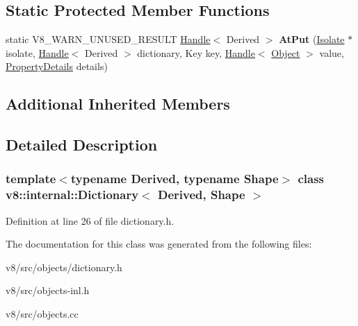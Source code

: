 \subsection*{Static Protected Member Functions}
\begin{DoxyCompactItemize}
\item 
\mbox{\label{classv8_1_1internal_1_1Dictionary_a0a9f58bba6ebd7969d6ca0740bbe90fe}} 
static V8\+\_\+\+W\+A\+R\+N\+\_\+\+U\+N\+U\+S\+E\+D\+\_\+\+R\+E\+S\+U\+LT \mbox{\hyperlink{classv8_1_1internal_1_1Handle}{Handle}}$<$ Derived $>$ {\bfseries At\+Put} (\mbox{\hyperlink{classv8_1_1internal_1_1Isolate}{Isolate}} $\ast$isolate, \mbox{\hyperlink{classv8_1_1internal_1_1Handle}{Handle}}$<$ Derived $>$ dictionary, Key key, \mbox{\hyperlink{classv8_1_1internal_1_1Handle}{Handle}}$<$ \mbox{\hyperlink{classv8_1_1internal_1_1Object}{Object}} $>$ value, \mbox{\hyperlink{classv8_1_1internal_1_1PropertyDetails}{Property\+Details}} details)
\end{DoxyCompactItemize}
\subsection*{Additional Inherited Members}


\subsection{Detailed Description}
\subsubsection*{template$<$typename Derived, typename Shape$>$\newline
class v8\+::internal\+::\+Dictionary$<$ Derived, Shape $>$}



Definition at line 26 of file dictionary.\+h.



The documentation for this class was generated from the following files\+:\begin{DoxyCompactItemize}
\item 
v8/src/objects/dictionary.\+h\item 
v8/src/objects-\/inl.\+h\item 
v8/src/objects.\+cc\end{DoxyCompactItemize}
